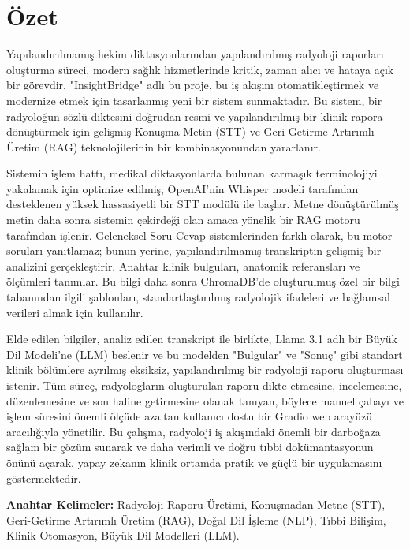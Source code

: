 \chapter*{Özet}

Yapılandırılmamış hekim diktasyonlarından yapılandırılmış radyoloji raporları oluşturma süreci, modern sağlık hizmetlerinde kritik, zaman alıcı ve hataya açık bir görevdir. "InsightBridge" adlı bu proje, bu iş akışını otomatikleştirmek ve modernize etmek için tasarlanmış yeni bir sistem sunmaktadır. Bu sistem, bir radyoloğun sözlü diktesini doğrudan resmi ve yapılandırılmış bir klinik rapora dönüştürmek için gelişmiş Konuşma-Metin (STT) ve Geri-Getirme Artırımlı Üretim (RAG) teknolojilerinin bir kombinasyonundan yararlanır.

Sistemin işlem hattı, medikal diktasyonlarda bulunan karmaşık terminolojiyi yakalamak için optimize edilmiş, OpenAI'nin Whisper modeli tarafından desteklenen yüksek hassasiyetli bir STT modülü ile başlar. Metne dönüştürülmüş metin daha sonra sistemin çekirdeği olan amaca yönelik bir RAG motoru tarafından işlenir. Geleneksel Soru-Cevap sistemlerinden farklı olarak, bu motor soruları yanıtlamaz; bunun yerine, yapılandırılmamış transkriptin gelişmiş bir analizini gerçekleştirir. Anahtar klinik bulguları, anatomik referansları ve ölçümleri tanımlar. Bu bilgi daha sonra ChromaDB'de oluşturulmuş özel bir bilgi tabanından ilgili şablonları, standartlaştırılmış radyolojik ifadeleri ve bağlamsal verileri almak için kullanılır.

Elde edilen bilgiler, analiz edilen transkript ile birlikte, Llama 3.1 adlı bir Büyük Dil Modeli'ne (LLM) beslenir ve bu modelden "Bulgular" ve "Sonuç" gibi standart klinik bölümlere ayrılmış eksiksiz, yapılandırılmış bir radyoloji raporu oluşturması istenir. Tüm süreç, radyologların oluşturulan raporu dikte etmesine, incelemesine, düzenlemesine ve son haline getirmesine olanak tanıyan, böylece manuel çabayı ve işlem süresini önemli ölçüde azaltan kullanıcı dostu bir Gradio web arayüzü aracılığıyla yönetilir. Bu çalışma, radyoloji iş akışındaki önemli bir darboğaza sağlam bir çözüm sunarak ve daha verimli ve doğru tıbbi dokümantasyonun önünü açarak, yapay zekanın klinik ortamda pratik ve güçlü bir uygulamasını göstermektedir.

\vfill
\textbf{Anahtar Kelimeler:} Radyoloji Raporu Üretimi, Konuşmadan Metne (STT), Geri-Getirme Artırımlı Üretim (RAG), Doğal Dil İşleme (NLP), Tıbbi Bilişim, Klinik Otomasyon, Büyük Dil Modelleri (LLM).
\clearpage